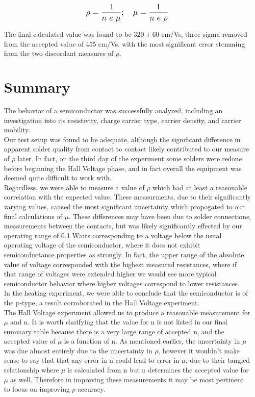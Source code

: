 \documentclass[aps,prl,reprint]{revtex4-2}
\begin{document}
\begin{equation}
	\mathlarger{ \rho = \frac{1}{n\ e\ \mu} ;\ \ \ 
	\mu = \frac{1}{n\ e\ \rho} }
\label{mu}
\end{equation}

The final calculated value was found to be $320 \pm 60$ cm/Vs, three sigma removed from
the accepted value of 455 cm/Vs, with the most significant error stemming from the two discordant
measures of $\rho$.


\section{Summary}
The behavior of a semiconductor was successfully analyzed, including an investigation into its
resistivity, charge carrier type, carrier density, and carrier mobility. \\

Our test setup was found to be adequate, although the significant difference in apparent 
solder quality from contact to contact likely contributed to our measure of $\rho$ later.
In fact, on the third day of the experiment some solders were redone before beginning the
Hall Voltage phase, and in fact overall the equipment was deemed quite difficult to work with.\\

Regardless, we were able to measure a value of $\rho$ which had at least a reasonable correlation
with the expected value. These measurments, due to their significantly varying values, caused
the most significant uncertainty which propogated to our final calculations of $\mu$. These
differences may have been due to solder connections, measurements between the contacts, but was
likely significantly effected by our operating range of 0.1 Watts corresponding to a voltage
below the usual operating voltage of the semiconductor, where it does not exhibit semiconductance
properties as strongly. In fact, the upper range of the absolute value of voltage corresponded
with the highest measured resistances, where if that range of voltages were extended higher we 
would see more typical semiconductor behavior where higher voltages correspond to lower 
resistances. \\

In the heating experiment, we were able to conclude that the semiconductor is of the p-type, 
a result corroborated in the Hall Voltage experiment. \\

The Hall Voltage experiment allowed us to produce a reasonable measurement for $\mu$ and n. 
It is worth clarifying that the value for n is not listed in our final summary table because
there is a very large range of accepted n, and the accepted value of $\mu$ is a function of
n. As mentioned earlier, the uncertainty in $\mu$ was due almost entirely due to the uncertainty
in $\rho$, however it wouldn't make sense to say that that any error in n could lead to error in
$\mu$, due to their tangled relationship where $\mu$ is calculated from n but n determines the
accepted value for $\mu$ as well. Therefore in improving these measurements it may be 
most pertinent to focus on improving $\rho$ accuracy.
\end{document}
